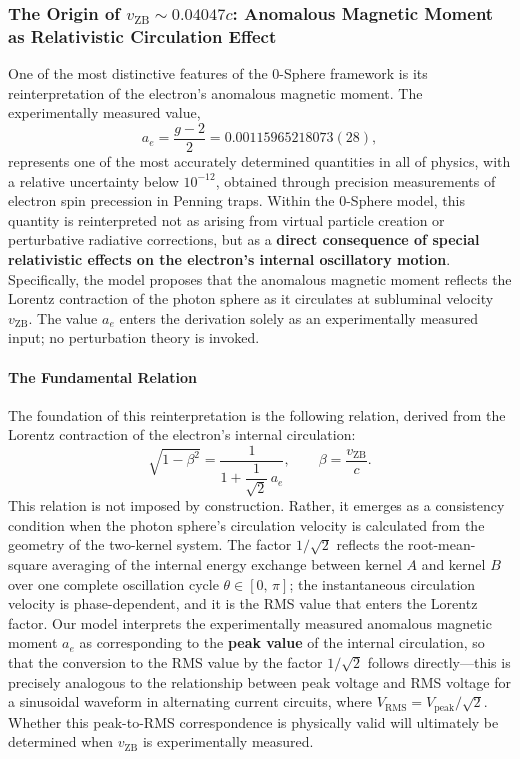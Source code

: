 \documentclass[12pt,letterpaper]{article}
\begin{document}
\subsubsection{The Origin of $v_{\mathrm{ZB}} \sim 0.04047c$: Anomalous Magnetic Moment as Relativistic Circulation Effect}
\label{subsubsec:vzb_origin}

One of the most distinctive features of the 0-Sphere framework is its reinterpretation of the electron's anomalous magnetic moment. The experimentally measured value,
\begin{equation}
  a_e = \frac{g-2}{2} = 0.00115965218073(28),
\end{equation}
represents one of the most accurately determined quantities in all of physics, with a relative uncertainty below $10^{-12}$, obtained through precision measurements of electron spin precession in Penning traps. Within the 0-Sphere model, this quantity is reinterpreted not as arising from virtual particle creation or perturbative radiative corrections, but as a \textbf{direct consequence of special relativistic effects on the electron's internal oscillatory motion}. Specifically, the model proposes that the anomalous magnetic moment reflects the Lorentz contraction of the photon sphere as it circulates at subluminal velocity $v_{\mathrm{ZB}}$. The value $a_e$ enters the derivation solely as an experimentally measured input; no perturbation theory is invoked.

\paragraph{The Fundamental Relation}

The foundation of this reinterpretation is the following relation, derived from the Lorentz contraction of the electron's internal circulation:
\begin{equation}
  \sqrt{1 - \beta^2} = \frac{1}{1 + \dfrac{1}{\sqrt{2}}\,a_e}, \qquad \beta = \frac{v_{\mathrm{ZB}}}{c}.
\end{equation}
This relation is not imposed by construction. Rather, it emerges as a consistency condition when the photon sphere's circulation velocity is calculated from the geometry of the two-kernel system. The factor $1/\sqrt{2}$ reflects the root-mean-square averaging of the internal energy exchange between kernel $A$ and kernel $B$ over one complete oscillation cycle $\theta \in [0,\,\pi]$; the instantaneous circulation velocity is phase-dependent, and it is the RMS value that enters the Lorentz factor. Our model interprets the experimentally measured anomalous magnetic moment $a_e$ as corresponding to the \textbf{peak value} of the internal circulation, so that the conversion to the RMS value by the factor $1/\sqrt{2}$ follows directly---this is precisely analogous to the relationship between peak voltage and RMS voltage for a sinusoidal waveform in alternating current circuits, where $V_{\mathrm{RMS}} = V_{\mathrm{peak}}/\sqrt{2}$. Whether this peak-to-RMS correspondence is physically valid will ultimately be determined when $v_{\mathrm{ZB}}$ is experimentally measured.
\end{document}
